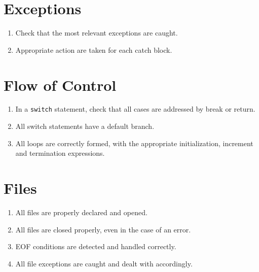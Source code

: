 \documentclass{scrreprt}
\begin{document}
\begin{appendix}
\section*{Exceptions}\begin{enumerate}[resume]
\item Check that the most relevant exceptions are caught.
\item Appropriate action are taken for each catch block.
\end{enumerate}

\section*{Flow of Control}\begin{enumerate}[resume]
\item In a \texttt{switch} statement, check that all cases are addressed by break or return.
\item All switch statements have a default branch.
\item All loops are correctly formed, with the appropriate initialization, increment and termination expressions.
\end{enumerate}

\section*{Files}\begin{enumerate}[resume]
\item All files are properly declared and opened.
\item All files are closed properly, even in the case of an error.
\item EOF conditions are detected and handled correctly.
\item All file exceptions are caught and dealt with accordingly.
\end{enumerate}

\end{appendix}
\end{document}
